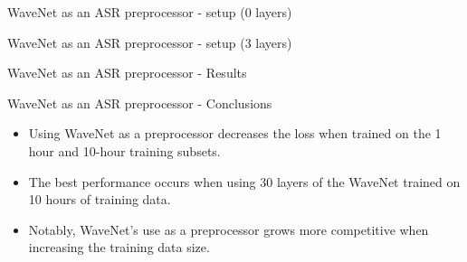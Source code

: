 \documentclass[
  ignorenonframetext,
  aspectratio=169,
]{beamer}
\begin{document}
\begin{frame}{WaveNet as an ASR preprocessor - setup (0 layers)}
\protect\hypertarget{wavenet-as-an-asr-preprocessor---setup-0-layers}{}
\begin{figure}
\centering
\resizebox{\columnwidth}{!}{

}
\end{figure}
\end{frame}

\begin{frame}{WaveNet as an ASR preprocessor - setup (3 layers)}
\protect\hypertarget{wavenet-as-an-asr-preprocessor---setup-3-layers}{}
\begin{figure}
\centering
\resizebox{!}{0.9\textheight}{

}
\end{figure}
\end{frame}

\begin{frame}{WaveNet as an ASR preprocessor - Results}
\protect\hypertarget{wavenet-as-an-asr-preprocessor---results}{}
\begin{figure}
\centering
{}\end{figure}
\end{frame}

\begin{frame}{WaveNet as an ASR preprocessor - Conclusions}
\protect\hypertarget{wavenet-as-an-asr-preprocessor---conclusions}{}
\begin{itemize}
\item
  Using WaveNet as a preprocessor decreases the loss when trained on the
  1 hour and 10-hour training subsets.
\item
  The best performance occurs when using 30 layers of the WaveNet
  trained on 10 hours of training data.
\item
  Notably, WaveNet's use as a preprocessor grows more competitive when
  increasing the training data size.
\end{itemize}
\end{frame}
\end{document}
